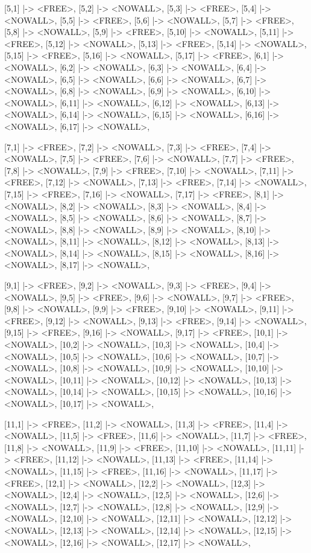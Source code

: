 \begin{vdmpp}[breaklines=true]
{     [5,1] |-> <FREE>, [5,2] |-> <NOWALL>, [5,3] |-> <FREE>, [5,4] |-> <NOWALL>, [5,5] |-> <FREE>, [5,6] |-> <NOWALL>, [5,7] |-> <FREE>, [5,8] |-> <NOWALL>, [5,9] |-> <FREE>, [5,10] |-> <NOWALL>, 
     [5,11] |-> <FREE>, [5,12] |-> <NOWALL>, [5,13] |-> <FREE>, [5,14] |-> <NOWALL>, [5,15] |-> <FREE>, [5,16] |-> <NOWALL>, [5,17] |-> <FREE>,
     [6,1] |-> <NOWALL>, [6,2] |-> <NOWALL>, [6,3] |-> <NOWALL>, [6,4] |-> <NOWALL>, [6,5] |-> <NOWALL>, [6,6] |-> <NOWALL>, [6,7] |-> <NOWALL>, [6,8] |-> <NOWALL>, [6,9] |-> <NOWALL>, [6,10] |-> <NOWALL>, 
     [6,11] |-> <NOWALL>, [6,12] |-> <NOWALL>, [6,13] |-> <NOWALL>, [6,14] |-> <NOWALL>, [6,15] |-> <NOWALL>, [6,16] |-> <NOWALL>, [6,17] |-> <NOWALL>,
     
     [7,1] |-> <FREE>, [7,2] |-> <NOWALL>, [7,3] |-> <FREE>, [7,4] |-> <NOWALL>, [7,5] |-> <FREE>, [7,6] |-> <NOWALL>, [7,7] |-> <FREE>, [7,8] |-> <NOWALL>, [7,9] |-> <FREE>, [7,10] |-> <NOWALL>, 
     [7,11] |-> <FREE>, [7,12] |-> <NOWALL>, [7,13] |-> <FREE>, [7,14] |-> <NOWALL>, [7,15] |-> <FREE>, [7,16] |-> <NOWALL>, [7,17] |-> <FREE>,
     [8,1] |-> <NOWALL>, [8,2] |-> <NOWALL>, [8,3] |-> <NOWALL>, [8,4] |-> <NOWALL>, [8,5] |-> <NOWALL>, [8,6] |-> <NOWALL>, [8,7] |-> <NOWALL>, [8,8] |-> <NOWALL>, [8,9] |-> <NOWALL>, [8,10] |-> <NOWALL>, 
     [8,11] |-> <NOWALL>, [8,12] |-> <NOWALL>, [8,13] |-> <NOWALL>, [8,14] |-> <NOWALL>, [8,15] |-> <NOWALL>, [8,16] |-> <NOWALL>, [8,17] |-> <NOWALL>,
     
     [9,1] |-> <FREE>, [9,2] |-> <NOWALL>, [9,3] |-> <FREE>, [9,4] |-> <NOWALL>, [9,5] |-> <FREE>, [9,6] |-> <NOWALL>, [9,7] |-> <FREE>, [9,8] |-> <NOWALL>, [9,9] |-> <FREE>, [9,10] |-> <NOWALL>, 
     [9,11] |-> <FREE>, [9,12] |-> <NOWALL>, [9,13] |-> <FREE>, [9,14] |-> <NOWALL>, [9,15] |-> <FREE>, [9,16] |-> <NOWALL>, [9,17] |-> <FREE>,
     [10,1] |-> <NOWALL>, [10,2] |-> <NOWALL>, [10,3] |-> <NOWALL>, [10,4] |-> <NOWALL>, [10,5] |-> <NOWALL>, [10,6] |-> <NOWALL>, [10,7] |-> <NOWALL>, [10,8] |-> <NOWALL>, [10,9] |-> <NOWALL>, [10,10] |-> <NOWALL>, 
     [10,11] |-> <NOWALL>, [10,12] |-> <NOWALL>, [10,13] |-> <NOWALL>, [10,14] |-> <NOWALL>, [10,15] |-> <NOWALL>, [10,16] |-> <NOWALL>, [10,17] |-> <NOWALL>,
     
     [11,1] |-> <FREE>, [11,2] |-> <NOWALL>, [11,3] |-> <FREE>, [11,4] |-> <NOWALL>, [11,5] |-> <FREE>, [11,6] |-> <NOWALL>, [11,7] |-> <FREE>, [11,8] |-> <NOWALL>, [11,9] |-> <FREE>, [11,10] |-> <NOWALL>, 
     [11,11] |-> <FREE>, [11,12] |-> <NOWALL>, [11,13] |-> <FREE>, [11,14] |-> <NOWALL>, [11,15] |-> <FREE>, [11,16] |-> <NOWALL>, [11,17] |-> <FREE>,
     [12,1] |-> <NOWALL>, [12,2] |-> <NOWALL>, [12,3] |-> <NOWALL>, [12,4] |-> <NOWALL>, [12,5] |-> <NOWALL>, [12,6] |-> <NOWALL>, [12,7] |-> <NOWALL>, [12,8] |-> <NOWALL>, [12,9] |-> <NOWALL>, [12,10] |-> <NOWALL>, 
     [12,11] |-> <NOWALL>, [12,12] |-> <NOWALL>, [12,13] |-> <NOWALL>, [12,14] |-> <NOWALL>, [12,15] |-> <NOWALL>, [12,16] |-> <NOWALL>, [12,17] |-> <NOWALL>,
   
}
\end{vdmpp}
